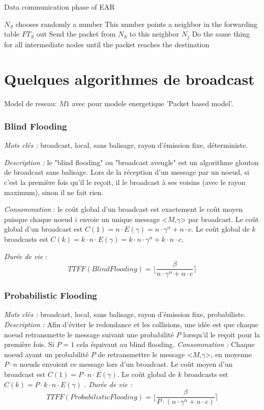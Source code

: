 \begin{algorithm}[H]
\caption{Data communication phase of EAR}
\label{algo_EAR_dcp}
\begin{algorithmic}

\STATE $N_S$ chooses randomly a number
\STATE This number points a neighbor in the forwarding table $FT_S$ out
\STATE Send the packet from $N_S$ to this neighbor $N_j$
\STATE Do the same thing for all intermediate nodes until the packet reaches the destination

\end{algorithmic}
\end{algorithm}



\section{Quelques algorithmes de broadcast}
Model de reseau: $M1$ avec pour modele energetique 'Packet based model'.

\subsubsection{Blind Flooding\label{blind_flooding}}
\emph{Mots clés :} broadcast, local, sans balisage, rayon d'émission fixe, déterministe.

\emph{Description :} le "blind flooding" ou "broadcast aveugle" est un algorithme glouton de broadcast sans balisage. Lors de la réception d'un message par un noeud, si c'est la première fois qu'il le reçoit, il le broadcast à ses voisins (avec le rayon maximum), sinon il ne fait rien.

\emph{Consommation} :  le coût global d'un broadcast est exactement le coût moyen puisque chaque noeud $i$ envoie un unique message <$M$,$\gamma$> par broadcast.
Le coût global d'un broadcast est $C(1) = n \cdot E( \gamma )= n\cdot \gamma^\alpha +  n\cdot c $.
Le coût global de $k$ broadcasts est $C(k) = k\cdot n \cdot E( \gamma )= k\cdot n \cdot \gamma^\alpha +  k \cdot n\cdot c $.

\emph{Durée de vie} :   $$TTFF(Blind Flooding)=\lfloor \frac{\beta}{n\cdot \gamma^\alpha +  n\cdot c} \rceil$$



\subsubsection{Probabilistic Flooding\label{proba_flooding}}
\emph{Mots clés :} broadcast, local, sans balisage, rayon d'émission fixe, probabiliste.
\emph{Description :} Afin d'éviter le redondance et les collisions, une idée est que chaque noeud retransmette le message suivant une probabilité $P$ lorsqu'il le reçoit pour la première fois. Si $P=1$ cela équivaut au blind flooding.
\emph{Consommation :} Chaque noeud ayant un probabilité $P$ de retransmettre le message <$M$,$\gamma$>, en moyenne $P\cdot n$ nœuds envoient ce message lors d'un broadcast.
Le coût moyen d'un broadcast est $C(1) = P\cdot n \cdot E( \gamma ) $. Le coût global de $k$ broadcasts est $C(k) = P\cdot k\cdot n \cdot E( \gamma ) $ .
\emph{Durée de vie :} $$TTFF(Probabilistic Flooding)=\lfloor \frac{\beta}{P \cdot (n\cdot \gamma^\alpha +  n\cdot c)} \rceil$$



